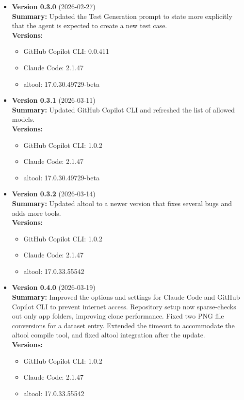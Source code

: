 \documentclass{article}
\begin{document}
\begin{itemize}
\item \textbf{Version 0.3.0} \hfill (2026-02-27)\\
\textbf{Summary:} Updated the Test Generation prompt to state more explicitly that the agent is expected to create a new test case.\\
\textbf{Versions:}
\begin{itemize}
\item GitHub Copilot CLI: 0.0.411
\item Claude Code: 2.1.47
\item altool: 17.0.30.49729-beta
\end{itemize}

\item \textbf{Version 0.3.1} \hfill (2026-03-11)\\
\textbf{Summary:} Updated GitHub Copilot CLI and refreshed the list of allowed models.\\
\textbf{Versions:}
\begin{itemize}
\item GitHub Copilot CLI: 1.0.2
\item Claude Code: 2.1.47
\item altool: 17.0.30.49729-beta
\end{itemize}

\item \textbf{Version 0.3.2} \hfill (2026-03-14)\\
\textbf{Summary:} Updated altool to a newer version that fixes several bugs and adds more tools.\\
\textbf{Versions:}
\begin{itemize}
\item GitHub Copilot CLI: 1.0.2
\item Claude Code: 2.1.47
\item altool: 17.0.33.55542
\end{itemize}

\item \textbf{Version 0.4.0} \hfill (2026-03-19)\\
\textbf{Summary:} Improved the options and settings for Claude Code and GitHub Copilot CLI to prevent internet access. Repository setup now sparse-checks out only app folders, improving clone performance. Fixed two PNG file conversions for a dataset entry. Extended the timeout to accommodate the altool compile tool, and fixed altool integration after the update.\\
\textbf{Versions:}
\begin{itemize}
\item GitHub Copilot CLI: 1.0.2
\item Claude Code: 2.1.47
\item altool: 17.0.33.55542
\end{itemize}

\end{itemize}
\end{document}
